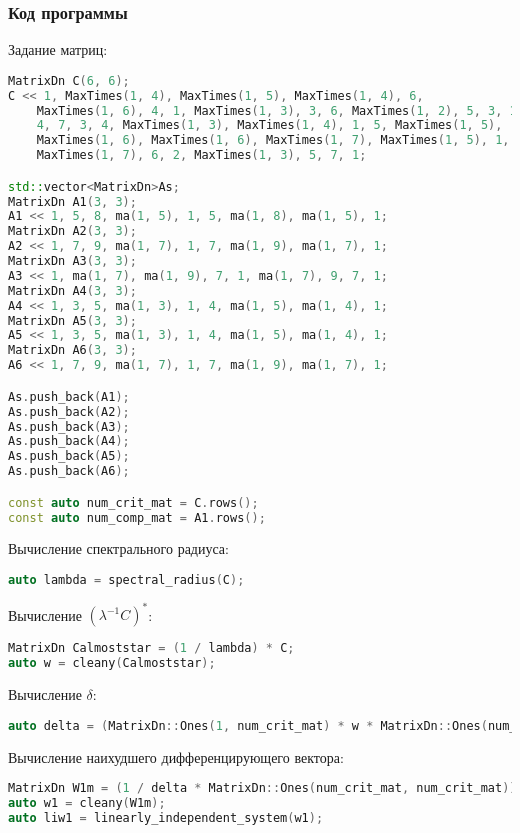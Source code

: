 \documentclass[specialist,
	substylefile = spbu.rtx,
	subf,href,colorlinks=true, 12pt]{disser}
\begin{document}
\subsubsection{Код программы}

Задание матриц:
\begin{lstlisting}[language=c++,basicstyle=\small\ttfamily,keywordstyle=\color{red}]
MatrixDn C(6, 6);
C << 1, MaxTimes(1, 4), MaxTimes(1, 5), MaxTimes(1, 4), 6,
    MaxTimes(1, 6), 4, 1, MaxTimes(1, 3), 3, 6, MaxTimes(1, 2), 5, 3, 1,
    4, 7, 3, 4, MaxTimes(1, 3), MaxTimes(1, 4), 1, 5, MaxTimes(1, 5),
    MaxTimes(1, 6), MaxTimes(1, 6), MaxTimes(1, 7), MaxTimes(1, 5), 1,
    MaxTimes(1, 7), 6, 2, MaxTimes(1, 3), 5, 7, 1;

std::vector<MatrixDn>As;
MatrixDn A1(3, 3);
A1 << 1, 5, 8, ma(1, 5), 1, 5, ma(1, 8), ma(1, 5), 1;
MatrixDn A2(3, 3);
A2 << 1, 7, 9, ma(1, 7), 1, 7, ma(1, 9), ma(1, 7), 1;
MatrixDn A3(3, 3);
A3 << 1, ma(1, 7), ma(1, 9), 7, 1, ma(1, 7), 9, 7, 1;
MatrixDn A4(3, 3);
A4 << 1, 3, 5, ma(1, 3), 1, 4, ma(1, 5), ma(1, 4), 1;
MatrixDn A5(3, 3);
A5 << 1, 3, 5, ma(1, 3), 1, 4, ma(1, 5), ma(1, 4), 1;
MatrixDn A6(3, 3);
A6 << 1, 7, 9, ma(1, 7), 1, 7, ma(1, 9), ma(1, 7), 1;

As.push_back(A1);
As.push_back(A2);
As.push_back(A3);
As.push_back(A4);
As.push_back(A5);
As.push_back(A6);

const auto num_crit_mat = C.rows();
const auto num_comp_mat = A1.rows();
\end{lstlisting}

Вычисление спектрального радиуса:
\begin{lstlisting}[language=c++,basicstyle=\footnotesize\ttfamily]
auto lambda = spectral_radius(C);
\end{lstlisting}

Вычисление $(\lambda^{-1}C)^*$:
\begin{lstlisting}[language=c++,basicstyle=\footnotesize\ttfamily]
MatrixDn Calmoststar = (1 / lambda) * C;
auto w = cleany(Calmoststar);
\end{lstlisting}


Вычисление $\delta$:
\begin{lstlisting}[language=c++,basicstyle=\footnotesize\ttfamily]
auto delta = (MatrixDn::Ones(1, num_crit_mat) * w * MatrixDn::Ones(num_crit_mat, 1)).value();
\end{lstlisting}

Вычисление наихудшего дифференцирующего вектора:
\begin{lstlisting}[language=c++,basicstyle=\footnotesize\ttfamily]
MatrixDn W1m = (1 / delta * MatrixDn::Ones(num_crit_mat, num_crit_mat)) + Calmoststar;
auto w1 = cleany(W1m);
auto liw1 = linearly_independent_system(w1);
\end{lstlisting}
\end{document}
